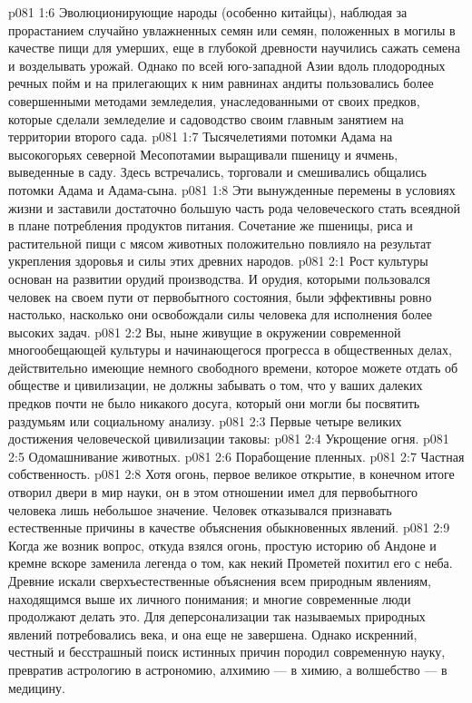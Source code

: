 \vs p081 1:6 Эволюционирующие народы (особенно китайцы), наблюдая за прорастанием случайно увлажненных семян или семян, положенных в могилы в качестве пищи для умерших, еще в глубокой древности научились сажать семена и возделывать урожай. Однако по всей юго\hyp{}западной Азии вдоль плодородных речных пойм и на прилегающих к ним равнинах андиты пользовались более совершенными методами земледелия, унаследованными от своих предков, которые сделали земледелие и садоводство своим главным занятием на территории второго сада.
\vs p081 1:7 Тысячелетиями потомки Адама на высокогорьях северной Месопотамии выращивали пшеницу и ячмень, выведенные в саду. Здесь встречались, торговали и смешивались общались потомки Адама и Адама\hyp{}сына.
\vs p081 1:8 Эти вынужденные перемены в условиях жизни и заставили достаточно большую часть рода человеческого стать всеядной в плане потребления продуктов питания. Сочетание же пшеницы, риса и растительной пищи с мясом животных положительно повлияло на результат укрепления здоровья и силы этих древних народов.
\vs p081 2:1 Рост культуры основан на развитии орудий производства. И орудия, которыми пользовался человек на своем пути от первобытного состояния, были эффективны ровно настолько, насколько они освобождали силы человека для исполнения более высоких задач.
\vs p081 2:2 Вы, ныне живущие в окружении современной многообещающей культуры и начинающегося прогресса в общественных делах, действительно имеющие немного свободного времени, которое можете отдать  об обществе и цивилизации, не должны забывать о том, что у ваших далеких предков почти не было никакого досуга, который они могли бы посвятить раздумьям или социальному анализу.
\vs p081 2:3 \pc Первые четыре великих достижения человеческой цивилизации таковы:
\vs p081 2:4 \bibnobreakspace Укрощение огня.
\vs p081 2:5 \bibnobreakspace Одомашнивание животных.
\vs p081 2:6 \bibnobreakspace Порабощение пленных.
\vs p081 2:7 \bibnobreakspace Частная собственность.
\vs p081 2:8 \pc Хотя огонь, первое великое открытие, в конечном итоге отворил двери в мир науки, он в этом отношении имел для первобытного человека лишь небольшое значение. Человек отказывался признавать естественные причины в качестве объяснения обыкновенных явлений.
\vs p081 2:9 Когда же возник вопрос, откуда взялся огонь, простую историю об Андоне и кремне вскоре заменила легенда о том, как некий Прометей похитил его с неба. Древние искали сверхъестественные объяснения всем природным явлениям, находящимся выше их личного понимания; и многие современные люди продолжают делать это. Для деперсонализации так называемых природных явлений потребовались века, и она еще не завершена. Однако искренний, честный и бесстрашный поиск истинных причин породил современную науку, превратив астрологию в астрономию, алхимию --- в химию, а волшебство --- в медицину.
